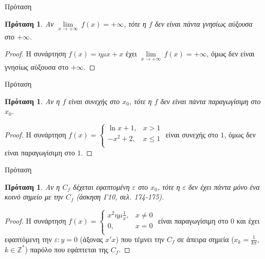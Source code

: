 \documentclass[greek]{beamer}
\newtheorem{proposition}[theorem]{Πρόταση}
\begin{document}
\begin{frame}{Πρόταση}
 \begin{proposition}
  \normalfont Αν $\underset{x\to +\infty }{\mathop{\lim }}\,f\left( x \right)=+\infty $, τότε η $f$ δεν είναι πάντα γνησίως αύξουσα στο $+\infty $.
 \end{proposition}
 \begin{proof}
  Η συνάρτηση $f\left( x \right)=\eta \mu x+x$ έχει $\underset{x\to +\infty }{\mathop{\lim }}\,f\left( x \right)=+\infty $, όμως δεν είναι γνησίως αύξουσα στο $+\infty $.
 \end{proof}
\end{frame}

\begin{frame}{Πρόταση}
 \begin{proposition}
  \normalfont Αν η $f$ είναι συνεχής στο ${{x}_{0}}$, τότε η $f$ δεν είναι πάντα παραγωγίσιμη στο ${{x}_{0}}$.
 \end{proposition}
 \begin{proof}
   Η συνάρτηση $f\left( x \right)=\left\{ \begin{array}{*{35}{l}}
      \ln x+1, & x>1  \\
      -{{x}^{2}}+2, & x\le 1  \\
   \end{array} \right.$ είναι συνεχής στο $1$, όμως δεν είναι παραγωγίσιμη στο $1$.
 \end{proof}
\end{frame}

\begin{frame}{Πρόταση}
 \begin{proposition}
  \normalfont Αν η ${{C}_{f}}$ δέχεται εφαπτομένη $\varepsilon $ στο ${{x}_{0}}$, τότε η $\varepsilon $ δεν έχει πάντα μόνο ένα κοινό σημείο με την ${{C}_{f}}$ (άσκηση Γ10, σελ. 174-175).
 \end{proposition}
 \begin{proof}
   Η συνάρτηση $f\left( x \right)=\left\{ \begin{array}{*{35}{l}}
      {{x}^{2}}\eta \mu \frac{1}{x}, & x\ne 0  \\
      0, & x=0  \\
   \end{array} \right.$ είναι παραγωγίσιμη στο $0$ και έχει εφαπτόμενη την $\varepsilon :y=0$ (άξονας $x'x$) που τέμνει την ${{C}_{f}}$ σε άπειρα σημεία (${{x}_{k}}=\frac{1}{k\pi }$, $k\in {{\mathbb{Z}}^{*}}$) παρόλο που εφάπτεται της ${{C}_{f}}$.
 \end{proof}
\end{frame}
\end{document}
